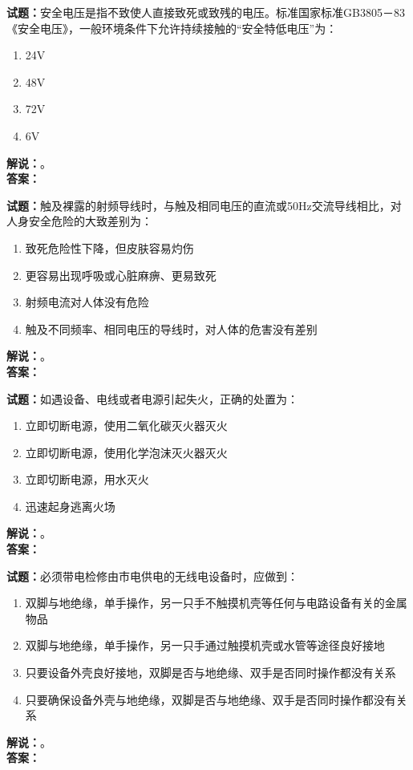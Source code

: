 \documentclass{ctexbook}
\begin{document}
\bigskip

\noindent\textbf{试题：}安全电压是指不致使人直接致死或致残的电压。标准国家标准GB3805－83《安全电压》，一般环境条件下允许持续接触的“安全特低电压”为：
\begin{enumerate}[leftmargin=3em]
  \item 24V
  \item 48V
  \item 72V
  \item 6V
\end{enumerate}
\noindent\textbf{解说：}\textbf{}。\\\noindent\textbf{答案：}

\bigskip

\noindent\textbf{试题：}触及裸露的射频导线时，与触及相同电压的直流或50Hz交流导线相比，对人身安全危险的大致差别为：
\begin{enumerate}[leftmargin=3em]
  \item 致死危险性下降，但皮肤容易灼伤
  \item 更容易出现呼吸或心脏麻痹、更易致死
  \item 射频电流对人体没有危险
  \item 触及不同频率、相同电压的导线时，对人体的危害没有差别
\end{enumerate}
\noindent\textbf{解说：}\textbf{}。\\\noindent\textbf{答案：}

\bigskip

\noindent\textbf{试题：}如遇设备、电线或者电源引起失火，正确的处置为：
\begin{enumerate}[leftmargin=3em]
  \item 立即切断电源，使用二氧化碳灭火器灭火
  \item 立即切断电源，使用化学泡沫灭火器灭火
  \item 立即切断电源，用水灭火
  \item 迅速起身逃离火场
\end{enumerate}
\noindent\textbf{解说：}\textbf{}。\\\noindent\textbf{答案：}

\bigskip

\noindent\textbf{试题：}必须带电检修由市电供电的无线电设备时，应做到：
\begin{enumerate}[leftmargin=3em]
  \item 双脚与地绝缘，单手操作，另一只手不触摸机壳等任何与电路设备有关的金属物品
  \item 双脚与地绝缘，单手操作，另一只手通过触摸机壳或水管等途径良好接地
  \item 只要设备外壳良好接地，双脚是否与地绝缘、双手是否同时操作都没有关系
  \item 只要确保设备外壳与地绝缘，双脚是否与地绝缘、双手是否同时操作都没有关系
\end{enumerate}
\noindent\textbf{解说：}\textbf{}。\\\noindent\textbf{答案：}
\end{document}
